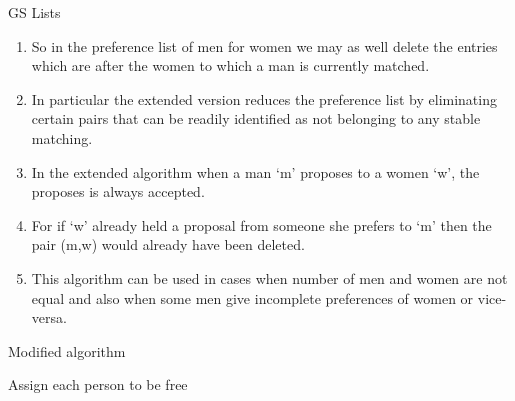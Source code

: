 \begin{frame}{GS Lists}
\begin{enumerate}

\item So in the preference list of men for women we may as well delete the entries which are after the women to which a man is currently matched.
\item In particular the extended version reduces the preference list by eliminating certain pairs that can be readily identified as not belonging to any stable matching.
\item In the extended algorithm when a man `m' proposes to a women `w', the proposes is always accepted.
\item For if `w' already held a proposal from someone she prefers to `m' then the pair (m,w) would already have been deleted.
\item This algorithm can be used in cases when number of men and women are not equal and also when some men give incomplete preferences of women or vice-versa.

\end{enumerate}
\end{frame}


\begin{algorithm}[H]



\caption{Modified algorithm}
Assign each person to be free\\

\end{algorithm}


